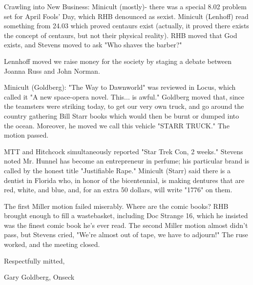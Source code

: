 \documentclass[12pt]{article}
\begin{document}
Crawling into New Business: Minicult (mostly)- there was a special 8.02 problem set for April Fools' Day, which RHB denounced as sexist. Minicult (Lenhoff) read something from 24.03 which proved centaurs exist (actually, it proved there exists the concept of centaurs, but not their physical reality). RHB moved that God exists, and Stevens moved to ask "Who shaves the barber?"

Lennhoff moved we raise money for the society by staging a debate between Joanna Russ and John Norman.

Minicult (Goldberg): "The Way to Dawnworld" was reviewed in Locus, which called it "A new space-opera novel. This... is awful." Goldberg moved that, since the teamsters were striking today, to get our very own truck, and go around the country gathering Bill Starr books which would then be burnt or dumped into the ocean. Moreover, he moved we call this vehicle "STARR TRUCK." The motion passed.

MTT and Hitchcock simultaneously reported "Star Trek Con, 2 weeks." Stevens noted Mr. Hunnel has become an entrepreneur in perfume; his particular brand is called by the honest title "Justifiable Rape." Minicult (Starr) said there is a dentist in Florida who, in honor of the bicentennial, is making dentures that are red, white, and blue, and, for an extra 50 dollars, will write "1776" on them.

The first Miller motion failed miserably. Where are the comic books? RHB brought enough to fill a wastebasket, including Doc Strange 16, which he insisted was the finest comic book he's ever read. The second Miller motion almost didn't pass, but Stevens cried, "We're almost out of tape, we have to adjourn!" The ruse worked, and the meeting closed.

\vspace{12pt}

\centerline{Respectfully mitted,}
\centerline{Gary Goldberg, Onseck}
\end{document}
